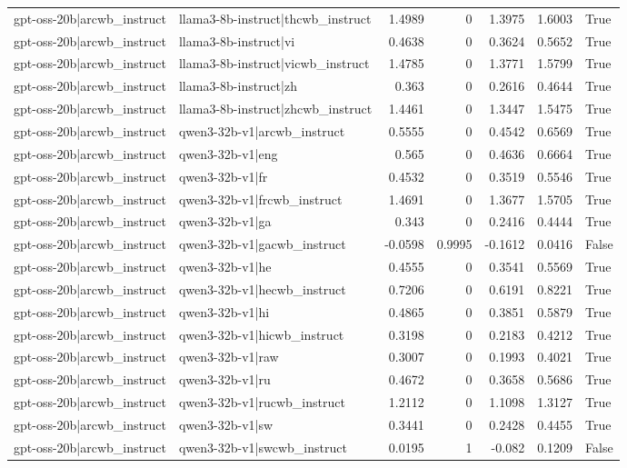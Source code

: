 \begin{table}
\begin{tabular}{l l r r r r l}
gpt-oss-20b|arcwb_instruct & llama3-8b-instruct|thcwb_instruct & 1.4989 & 0 & 1.3975 & 1.6003 & True \\
gpt-oss-20b|arcwb_instruct & llama3-8b-instruct|vi & 0.4638 & 0 & 0.3624 & 0.5652 & True \\
gpt-oss-20b|arcwb_instruct & llama3-8b-instruct|vicwb_instruct & 1.4785 & 0 & 1.3771 & 1.5799 & True \\
gpt-oss-20b|arcwb_instruct & llama3-8b-instruct|zh & 0.363 & 0 & 0.2616 & 0.4644 & True \\
gpt-oss-20b|arcwb_instruct & llama3-8b-instruct|zhcwb_instruct & 1.4461 & 0 & 1.3447 & 1.5475 & True \\
gpt-oss-20b|arcwb_instruct & qwen3-32b-v1|arcwb_instruct & 0.5555 & 0 & 0.4542 & 0.6569 & True \\
gpt-oss-20b|arcwb_instruct & qwen3-32b-v1|eng & 0.565 & 0 & 0.4636 & 0.6664 & True \\
gpt-oss-20b|arcwb_instruct & qwen3-32b-v1|fr & 0.4532 & 0 & 0.3519 & 0.5546 & True \\
gpt-oss-20b|arcwb_instruct & qwen3-32b-v1|frcwb_instruct & 1.4691 & 0 & 1.3677 & 1.5705 & True \\
gpt-oss-20b|arcwb_instruct & qwen3-32b-v1|ga & 0.343 & 0 & 0.2416 & 0.4444 & True \\
gpt-oss-20b|arcwb_instruct & qwen3-32b-v1|gacwb_instruct & -0.0598 & 0.9995 & -0.1612 & 0.0416 & False \\
gpt-oss-20b|arcwb_instruct & qwen3-32b-v1|he & 0.4555 & 0 & 0.3541 & 0.5569 & True \\
gpt-oss-20b|arcwb_instruct & qwen3-32b-v1|hecwb_instruct & 0.7206 & 0 & 0.6191 & 0.8221 & True \\
gpt-oss-20b|arcwb_instruct & qwen3-32b-v1|hi & 0.4865 & 0 & 0.3851 & 0.5879 & True \\
gpt-oss-20b|arcwb_instruct & qwen3-32b-v1|hicwb_instruct & 0.3198 & 0 & 0.2183 & 0.4212 & True \\
gpt-oss-20b|arcwb_instruct & qwen3-32b-v1|raw & 0.3007 & 0 & 0.1993 & 0.4021 & True \\
gpt-oss-20b|arcwb_instruct & qwen3-32b-v1|ru & 0.4672 & 0 & 0.3658 & 0.5686 & True \\
gpt-oss-20b|arcwb_instruct & qwen3-32b-v1|rucwb_instruct & 1.2112 & 0 & 1.1098 & 1.3127 & True \\
gpt-oss-20b|arcwb_instruct & qwen3-32b-v1|sw & 0.3441 & 0 & 0.2428 & 0.4455 & True \\
gpt-oss-20b|arcwb_instruct & qwen3-32b-v1|swcwb_instruct & 0.0195 & 1 & -0.082 & 0.1209 & False \\

\end{tabular}
\end{table}
